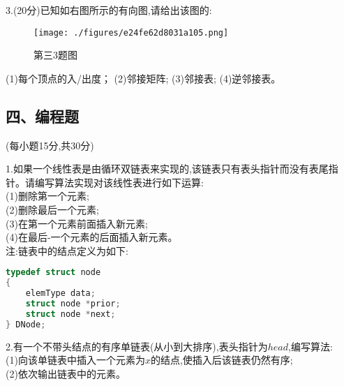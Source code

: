3.(20分)已知如右图所示的有向图,请给出该图的:
\begin{figure}[ht]
\centering
\texttt{[image: ./figures/e24fe62d8031a105.png]}
\caption{第三3题图} \label{fig_ZSDS11_1}
\end{figure}
(1)每个顶点的入/出度；
(2)邻接矩阵;
(3)邻接表;
(4)逆邻接表。

\subsection{四、编程题}
(每小题15分,共30分)

1.如果一个线性表是由循环双链表来实现的,该链表只有表头指针而没有表尾指针。请编写算法实现对该线性表进行如下运算: \\
(1)删除第一个元素; \\
(2)删除最后一个元素; \\
(3)在第一个元素前面插入新元素; \\
(4)在最后-一个元素的后面插入新元素。\\
注:链表中的结点定义为如下:
\begin{lstlisting}[language=cpp]
typedef struct node
{
    elemType data;
    struct node *prior;
    struct node *next;
} DNode;
\end{lstlisting}

2.有一个不带头结点的有序单链表(从小到大排序),表头指针为$head$,编写算法: \\
(1)向该单链表中插入一个元素为$x$的结点,使插入后该链表仍然有序; \\
(2)依次输出链表中的元素。
